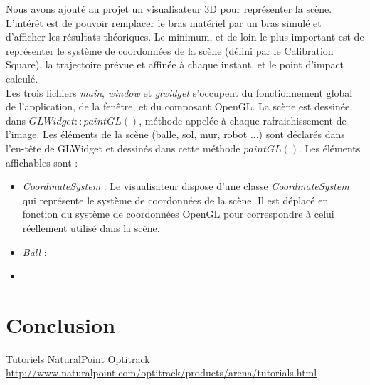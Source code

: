 \documentclass{article}[11pt]
\begin{document}
Nous avons ajouté au projet un visualisateur 3D pour représenter la scène. L'intérêt est de pouvoir remplacer le bras matériel par un bras simulé et d'afficher les résultats théoriques. Le minimum, et de loin le plus important est de représenter le système de coordonnées de la scène (défini par le Calibration Square), la trajectoire prévue et affinée à chaque instant, et le point d'impact calculé. \\

Les trois fichiers \textit{main}, \textit{window} et \textit{glwidget} s'occupent du fonctionnement global de l'application, de la fenêtre, et du composant OpenGL. La scène est dessinée dans $GLWidget::paintGL()$, méthode appelée à chaque rafraichissement de l'image. Les éléments de la scène (balle, sol, mur, robot ...) sont déclarés dans l'en-tête de GLWidget et dessinés dans cette méthode $paintGL()$. Les éléments affichables sont :\\

\begin{itemize}
\item \textit{CoordinateSystem} : Le visualisateur dispose d'une classe \textit{CoordinateSystem} qui représente le système de coordonnées de la scène. Il est déplacé en fonction du système de coordonnées OpenGL pour correspondre à celui réellement utilisé dans la scène.
\item \textit{Ball} : 
\item 
\end{itemize}



\section{Conclusion}


\begin{thebibliography}{}
  Tutoriels NaturalPoint Optitrack \\
  \url{http://www.naturalpoint.com/optitrack/products/arena/tutorials.html}

\end{thebibliography} 
\end{document}
